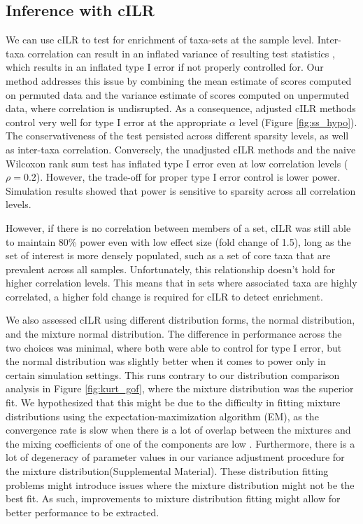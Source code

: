 \documentclass{article}
\begin{document}
\subsection*{Inference with cILR}
We can use cILR to test for enrichment of taxa-sets at the sample level. Inter-taxa correlation can result in an inflated variance of resulting test statistics \cite{wu2012}, which results in an inflated type I error if not properly controlled for. Our method addresses this issue by combining the mean estimate of scores computed on permuted data and the variance estimate of scores computed on unpermuted data, where correlation is undisrupted. As a consequence, adjusted cILR methods control very well for type I error at the appropriate $\alpha$ level (Figure \ref{fig:ss_hypo}). The conservativeness of the test persisted across different sparsity levels, as well as inter-taxa correlation. Conversely, the unadjusted cILR methods and the naive Wilcoxon rank sum test has inflated type I error even at low correlation levels ($\rho = 0.2$). However, the trade-off for proper type I error control is lower power. Simulation results showed that power is sensitive to sparsity across all correlation levels. 

However, if there is no correlation between members of a set, cILR was still able to maintain 80\% power even with low effect size (fold change of 1.5), long as the set of interest is more densely populated, such as a set of core taxa that are prevalent across all samples. Unfortunately, this relationship doesn't hold for higher correlation levels. This means that in sets where associated taxa are highly correlated, a higher fold change is required for cILR to detect enrichment. 

We also assessed cILR using different distribution forms, the normal distribution, and the mixture normal distribution. The difference in performance across the two choices was minimal, where both were able to control for type I error, but the normal distribution was slightly better when it comes to power only in certain simulation settings. This runs contrary to our distribution comparison analysis in Figure \ref{fig:kurt_gof}, where the mixture distribution was the superior fit. We hypothesized that this might be due to the difficulty in fitting mixture distributions using the expectation-maximization algorithm (EM), as the convergence rate is slow when there is a lot of overlap between the mixtures and the mixing coefficients of one of the components are low \cite{naim2012}. Furthermore, there is a lot of degeneracy of parameter values in our variance adjustment procedure for the mixture distribution(Supplemental Material). These distribution fitting problems might introduce issues where the mixture distribution might not be the best fit. As such, improvements to mixture distribution fitting might allow for better performance to be extracted.  
\end{document}
